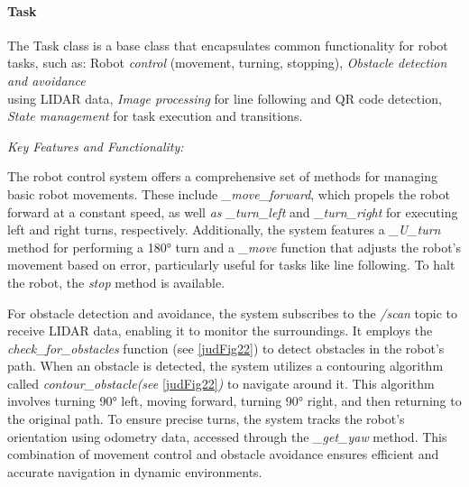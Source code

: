 \documentclass[../../main]{subfiles}
\begin{document}
\paragraph{Task}

The Task class is a base class that encapsulates common functionality
for robot tasks, such as: Robot \emph{control} (movement, turning,
stopping), \emph{Obstacle detection and avoidance} \\using LIDAR data,
\emph{Image processing} for line following and QR code detection,
\emph{State management} for task execution and transitions.

\emph{Key Features and Functionality:}

The robot control system offers a comprehensive set of methods for
managing basic robot movements. These include \emph{\_move\_forward},
which propels the robot forward at a constant speed, as well \emph{as
\_turn\_left} and \emph{\_turn\_right} for executing left and right
turns, respectively. Additionally, the system features a
\emph{\_U\_turn} method for performing a 180° turn and a \emph{\_move}
function that adjusts the robot's movement based on error, particularly
useful for tasks like line following. To halt the robot, the \emph{stop}
method is available.

For obstacle detection and avoidance, the system subscribes to the
\emph{/scan} topic to receive LIDAR data, enabling it to monitor the
surroundings. It employs the \emph{check\_for\_obstacles} function (see
\cref{judFig22}) to detect obstacles in the robot's path. When an obstacle is
detected, the system utilizes a contouring algorithm called
\emph{contour\_obstacle(see} \cref{judFig22}\emph{)} to navigate around it.
This algorithm involves turning 90° left, moving forward, turning 90°
right, and then returning to the original path. To ensure precise turns,
the system tracks the robot's orientation using odometry data, accessed
through the \emph{\_get\_yaw} method. This combination of movement
control and obstacle avoidance ensures efficient and accurate navigation
in dynamic environments.
\end{document}
